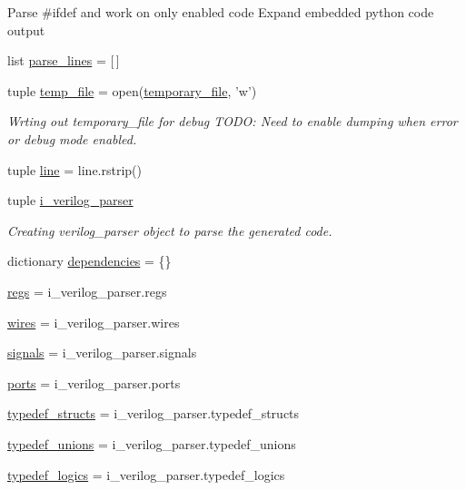 \begin{DoxyCompactItemize}
\begin{DoxyCompactList}
Parse \#ifdef and work on only enabled code Expand embedded python code output \end{DoxyCompactList}\item 
list \hyperlink{namespaceveripy_ac8745bd52ea5cd5e91036dc31970af88}{parse\-\_\-lines} = \mbox{[}$\,$\mbox{]}
\item 
tuple \hyperlink{namespaceveripy_a3c84020f008e06bdb41e3f89811b8fc5}{temp\-\_\-file} = open(\hyperlink{namespaceveripy_afad07aa9410aaa39c3a55e59c48c67d2}{temporary\-\_\-file}, 'w')
\begin{DoxyCompactList}\small\item\em Wrting out temporary\-\_\-file for debug T\-O\-D\-O\-: Need to enable dumping when error or debug mode enabled. \end{DoxyCompactList}\item 
tuple \hyperlink{namespaceveripy_a3cf9cf94513841f0d65d3081b08a55cc}{line} = line.\-rstrip()
\item 
tuple \hyperlink{namespaceveripy_ae26f09689713ff31ecbd1cc41f4d89e5}{i\-\_\-verilog\-\_\-parser}
\begin{DoxyCompactList}\small\item\em Creating verilog\-\_\-parser object to parse the generated code. \end{DoxyCompactList}\item 
dictionary \hyperlink{namespaceveripy_aebe879fba9bff8cd21ceb4e0ed71cfbd}{dependencies} = \{\}
\item 
\hyperlink{namespaceveripy_a31f321b7a4d58971598311ec1e9d65d5}{regs} = i\-\_\-verilog\-\_\-parser.\-regs
\item 
\hyperlink{namespaceveripy_a830a9b7ff5ad16c99be1ec8926435b58}{wires} = i\-\_\-verilog\-\_\-parser.\-wires
\item 
\hyperlink{namespaceveripy_af405930307c7e7f4310d7b720cf3c608}{signals} = i\-\_\-verilog\-\_\-parser.\-signals
\item 
\hyperlink{namespaceveripy_ad0eff554700802b50170079f6544c06d}{ports} = i\-\_\-verilog\-\_\-parser.\-ports
\item 
\hyperlink{namespaceveripy_a71e44f2f7882785c63f3a572b2d1dc95}{typedef\-\_\-structs} = i\-\_\-verilog\-\_\-parser.\-typedef\-\_\-structs
\item 
\hyperlink{namespaceveripy_a20ec0a39494208c8aad3119964661091}{typedef\-\_\-unions} = i\-\_\-verilog\-\_\-parser.\-typedef\-\_\-unions
\item 
\hyperlink{namespaceveripy_abc6a77d9ee05e424592ceb571f2b4dae}{typedef\-\_\-logics} = i\-\_\-verilog\-\_\-parser.\-typedef\-\_\-logics

\end{DoxyCompactItemize}
